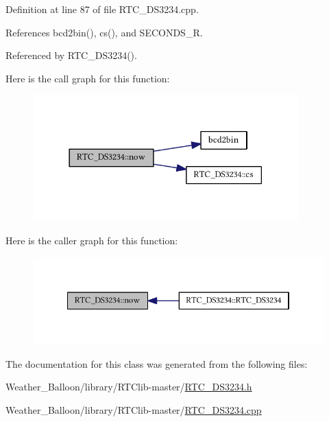 Definition at line 87 of file R\+T\+C\+\_\+\+D\+S3234.\+cpp.



References bcd2bin(), cs(), and S\+E\+C\+O\+N\+D\+S\+\_\+R.



Referenced by R\+T\+C\+\_\+\+D\+S3234().



Here is the call graph for this function\+:
\nopagebreak
\begin{figure}[H]
\begin{center}
\leavevmode
\includegraphics[width=290pt]{class_r_t_c___d_s3234_a1b22090fcfdbef26725da0232157a3c1_cgraph}
\end{center}
\end{figure}




Here is the caller graph for this function\+:\nopagebreak
\begin{figure}[H]
\begin{center}
\leavevmode
\includegraphics[width=334pt]{class_r_t_c___d_s3234_a1b22090fcfdbef26725da0232157a3c1_icgraph}
\end{center}
\end{figure}




The documentation for this class was generated from the following files\+:\begin{DoxyCompactItemize}
\item 
Weather\+\_\+\+Balloon/library/\+R\+T\+Clib-\/master/\hyperlink{_r_t_c___d_s3234_8h}{R\+T\+C\+\_\+\+D\+S3234.\+h}\item 
Weather\+\_\+\+Balloon/library/\+R\+T\+Clib-\/master/\hyperlink{_r_t_c___d_s3234_8cpp}{R\+T\+C\+\_\+\+D\+S3234.\+cpp}\end{DoxyCompactItemize}
